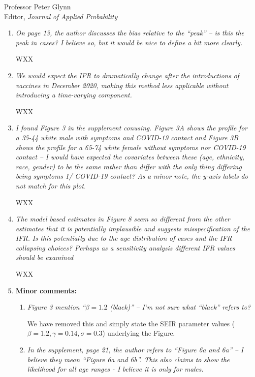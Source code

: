 \documentclass[11pt]{letter} %
\begin{document}
\begin{letter}{Professor
	Peter Glynn\\
	Editor, {\em Journal of Applied Probability}}
\begin{enumerate}
\vspace{5mm}
WXX
\vspace{5mm}
\item {\it On page 13, the author discusses the bias relative to the “peak” – is this the peak in cases? I believe so, but it would be nice to define a bit more clearly.}

\vspace{5mm}
WXX
\vspace{5mm}
\item {\it We would expect the IFR to dramatically change after the introductions of vaccines in December 2020, making this method less applicable without introducing a time-varying component.}

\vspace{5mm}
WXX
\vspace{5mm}
\item {\it I found Figure 3 in the supplement conusing. Figure 3A shows the profile for a 35-44 white male with symptoms and COVID-19 contact and Figure 3B shows the profile for a 65-74 white female without symptoms nor COVID-19 contact – I would have expected the covariates between these (age, ethnicity, race, gender) to be the same rather than differ with the only thing differing being symptoms 1/ COVID-19 contact? As a minor note, the y-axis labels do not match for this plot.}

\vspace{5mm}
WXX
\vspace{5mm}
\item {\it The model based estimates in Figure 8 seem so different from the other estimates that it is potentially implausible and suggests misspecification of the IFR. Is this potentially due to the age distribution of cases and the IFR collapsing choices? Perhaps as a sensitivity analysis different IFR values should be examined}

\vspace{5mm}
WXX
\vspace{5mm}
\item {\bf Minor comments:}
	\begin{enumerate}
		\item {\it Figure 3 mention “$\beta = 1.2$ (black)” – I’m not sure what “black” refers to?}
		\vspace{5mm}

		We have removed this and simply state the SEIR parameter values ($\beta = 1.2, \gamma = 0.14, \sigma = 0.3$) underlying the Figure.

		\item {\it In the supplement, page 21, the author refers to “Figure 6a and 6a” – I believe they mean “Figure 6a and 6b”. This also claims to show the likelihood for all age ranges - I believe it is only for males.}
	\end{enumerate}
\end{enumerate}

\end{letter}
\end{document}
